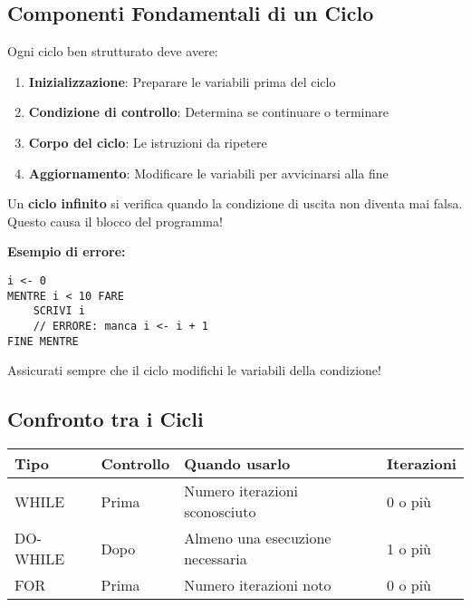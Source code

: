 \documentclass[a4paper,16pt]{article}
\begin{document}
\newpage
\subsection{Componenti Fondamentali di un Ciclo}

Ogni ciclo ben strutturato deve avere:

\begin{enumerate}[leftmargin=*]
    \item \textbf{Inizializzazione}: Preparare le variabili prima del ciclo
    \item \textbf{Condizione di controllo}: Determina se continuare o terminare
    \item \textbf{Corpo del ciclo}: Le istruzioni da ripetere
    \item \textbf{Aggiornamento}: Modificare le variabili per avvicinarsi alla fine
\end{enumerate}

\begin{tcolorbox}[colback=red!10!white,colframe=red!75!black,title=Attenzione: Cicli Infiniti!]
Un \textbf{ciclo infinito} si verifica quando la condizione di uscita non diventa mai falsa. Questo causa il blocco del programma!

\textbf{Esempio di errore:}
\begin{lstlisting}
i <- 0
MENTRE i < 10 FARE
    SCRIVI i
    // ERRORE: manca i <- i + 1
FINE MENTRE
\end{lstlisting}

Assicurati sempre che il ciclo modifichi le variabili della condizione!
\end{tcolorbox}

\subsection{Confronto tra i Cicli}

\begin{center}
\begin{tabular}{|p{3cm}|p{4cm}|p{4cm}|p{3cm}|}
\hline
\textbf{Tipo} & \textbf{Controllo} & \textbf{Quando usarlo} & \textbf{Iterazioni} \\
\hline
WHILE & Prima & Numero iterazioni sconosciuto & 0 o più \\
\hline
DO-WHILE & Dopo & Almeno una esecuzione necessaria & 1 o più \\
\hline
FOR & Prima & Numero iterazioni noto & 0 o più \\
\hline
\end{tabular}
\end{center}
\end{document}

